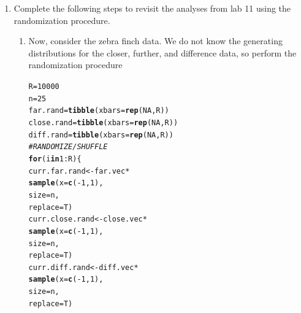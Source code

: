 \documentclass{article}\usepackage[]{graphicx}\usepackage[]{xcolor}
\makeatletter
\newcommand{\hlnum}[1]{\textcolor[rgb]{0.686,0.059,0.569}{#1}}%
\newcommand{\hlcom}[1]{\textcolor[rgb]{0.678,0.584,0.686}{\textit{#1}}}%
\newcommand{\hlopt}[1]{\textcolor[rgb]{0,0,0}{#1}}%
\newcommand{\hldef}[1]{\textcolor[rgb]{0.345,0.345,0.345}{#1}}%
\newcommand{\hlkwa}[1]{\textcolor[rgb]{0.161,0.373,0.58}{\textbf{#1}}}%
\newcommand{\hlkwb}[1]{\textcolor[rgb]{0.69,0.353,0.396}{#1}}%
\newcommand{\hlkwc}[1]{\textcolor[rgb]{0.333,0.667,0.333}{#1}}%
\newcommand{\hlkwd}[1]{\textcolor[rgb]{0.737,0.353,0.396}{\textbf{#1}}}%
\newenvironment{kframe}{%
 \def\at@end@of@kframe{}%
 \ifinner\ifhmode%
  \def\at@end@of@kframe{\end{minipage}}%
  \begin{minipage}{\columnwidth}%
 \fi\fi%
 \def\FrameCommand##1{\hskip\@totalleftmargin \hskip-\fboxsep
 \colorbox{shadecolor}{##1}\hskip-\fboxsep
     \hskip-\linewidth \hskip-\@totalleftmargin \hskip\columnwidth}%
 \MakeFramed {\advance\hsize-\width
   \@totalleftmargin\z@ \linewidth\hsize
   \@setminipage}}%
 {\par\unskip\endMakeFramed%
 \at@end@of@kframe}
\newenvironment{knitrout}{}{} %
\makeatother
\begin{document}
\begin{enumerate}
\item Complete the following steps to revisit the analyses from lab 11 using the
randomization procedure.
\begin{enumerate}
\item Now, consider the zebra finch data. We do not know the generating distributions
for the closer, further, and difference data, so perform the randomization procedure
\begin{knitrout}
\color{fgcolor}\begin{kframe}
\begin{alltt}
\hldef{R} \hlkwb{=} \hlnum{10000}
\hldef{n} \hlkwb{=} \hlnum{25}
\hldef{far.rand} \hlkwb{=} \hlkwd{tibble}\hldef{(}\hlkwc{xbars} \hldef{=} \hlkwd{rep}\hldef{(}\hlnum{NA}\hldef{, R))}
\hldef{close.rand} \hlkwb{=} \hlkwd{tibble}\hldef{(}\hlkwc{xbars} \hldef{=} \hlkwd{rep}\hldef{(}\hlnum{NA}\hldef{, R))}
\hldef{diff.rand} \hlkwb{=} \hlkwd{tibble}\hldef{(}\hlkwc{xbars} \hldef{=} \hlkwd{rep}\hldef{(}\hlnum{NA}\hldef{, R))}
\hlcom{# RANDOMIZE / SHUFFLE}
\hlkwa{for}\hldef{(i} \hlkwa{in} \hlnum{1}\hlopt{:}\hldef{R)\{}
  \hldef{curr.far.rand} \hlkwb{<-} \hldef{far.vec} \hlopt{*}
    \hlkwd{sample}\hldef{(}\hlkwc{x} \hldef{=} \hlkwd{c}\hldef{(}\hlopt{-}\hlnum{1}\hldef{,} \hlnum{1}\hldef{),}
           \hlkwc{size} \hldef{= n,}
           \hlkwc{replace} \hldef{= T)}
  \hldef{curr.close.rand} \hlkwb{<-} \hldef{close.vec} \hlopt{*}
    \hlkwd{sample}\hldef{(}\hlkwc{x} \hldef{=} \hlkwd{c}\hldef{(}\hlopt{-}\hlnum{1}\hldef{,} \hlnum{1}\hldef{),}
           \hlkwc{size} \hldef{= n,}
           \hlkwc{replace} \hldef{= T)}
  \hldef{curr.diff.rand} \hlkwb{<-} \hldef{diff.vec} \hlopt{*}
    \hlkwd{sample}\hldef{(}\hlkwc{x} \hldef{=} \hlkwd{c}\hldef{(}\hlopt{-}\hlnum{1}\hldef{,} \hlnum{1}\hldef{),}
           \hlkwc{size} \hldef{= n,}
           \hlkwc{replace} \hldef{= T)}


\end{alltt}
\end{kframe}
\end{knitrout}
\end{enumerate}
\end{enumerate}
\end{document}
